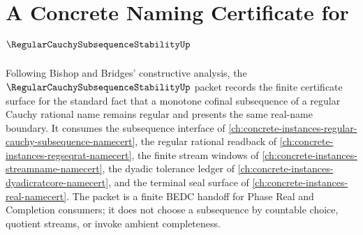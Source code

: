 \chapter{A Concrete Naming Certificate for $\RegularCauchySubsequenceStabilityUp$}
\label{ch:concrete-instances-regular-cauchy-subsequence-stability-namecert}

Following Bishop and Bridges' constructive analysis, the $\RegularCauchySubsequenceStabilityUp$ packet records the finite certificate surface for the standard fact that a monotone cofinal subsequence of a regular Cauchy rational name remains regular and presents the same real-name boundary. It consumes the subsequence interface of \autoref{ch:concrete-instances-regular-cauchy-subsequence-namecert}, the regular rational readback of \autoref{ch:concrete-instances-regseqrat-namecert}, the finite stream windows of \autoref{ch:concrete-instances-streamname-namecert}, the dyadic tolerance ledger of \autoref{ch:concrete-instances-dyadicratcore-namecert}, and the terminal seal surface of \autoref{ch:concrete-instances-real-namecert}. The packet is a finite BEDC handoff for Phase Real and Completion consumers; it does not choose a subsequence by countable choice, quotient streams, or invoke ambient completeness.

